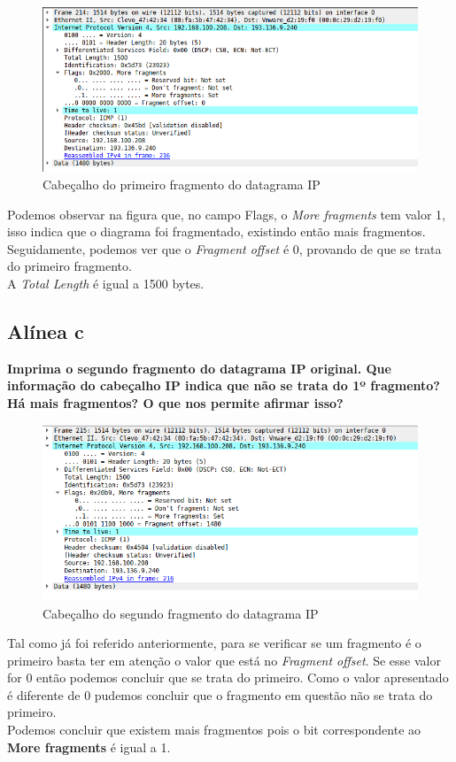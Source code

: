 \documentclass[a4paper]{report}
\begin{document}
\begin{figure}[H]
    \centering 
    \includegraphics[width=\textwidth]{images/fragmentDatagramaIpEx3.png}
    \caption{Cabeçalho do primeiro fragmento do datagrama IP}
    \label{fig:fragmentDatagramaIpEx3}
\end{figure}
Podemos observar na figura que, no campo Flags, o \textit{More fragments} tem
valor 1, isso indica que o diagrama foi fragmentado, existindo então mais
fragmentos.\\
Seguidamente, podemos ver que o \textit{Fragment offset} é 0, provando de que se
trata do primeiro fragmento.\\
A \textit{Total Length} é igual a 1500 bytes.

\pagebreak
\subsection{Alínea c}
\textbf{Imprima o segundo fragmento do datagrama IP original. Que informação do
cabeçalho IP indica que não se trata do 1º fragmento? Há mais fragmentos? O que
nos permite afirmar isso?}

\begin{figure}[H]
    \centering 
    \includegraphics[width=\textwidth]{images/fragment2DatagramaIpEx3.png}
    \caption{Cabeçalho do segundo fragmento do datagrama IP}
    \label{fig:fragment2DatagramaIpEx3}
\end{figure}
Tal como já foi referido anteriormente, para se verificar se um fragmento é o
primeiro basta ter em atenção o valor que está no \textit{Fragment offset}. Se
esse valor for 0 então podemos concluir que se trata do primeiro. Como o valor
apresentado é diferente de 0 pudemos concluir que o fragmento em questão não se
trata do primeiro.\\
Podemos concluir que existem mais fragmentos pois o bit correspondente ao
\textbf{More fragments} é igual a 1.
\end{document}
